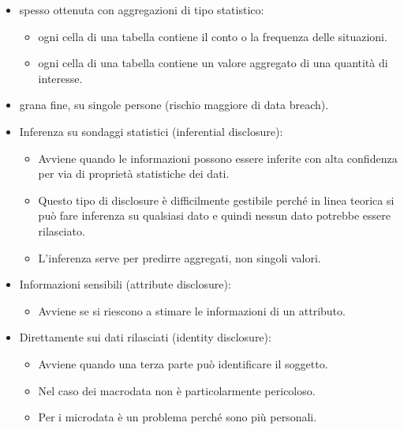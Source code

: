 \begin{itemize}
  \item {} spesso ottenuta con aggregazioni di tipo statistico:
    \begin{itemize}
      \item {} ogni cella di una tabella contiene il conto o la frequenza delle situazioni.
      \item {} ogni cella di una tabella contiene un valore aggregato di una quantità di interesse.
    \end{itemize}
  \item {} grana fine, su singole persone (rischio maggiore di data breach).
\end{itemize}


\begin{itemize}
  \item Inferenza su sondaggi statistici (inferential disclosure):
    \begin{itemize}
      \item Avviene quando le informazioni possono essere inferite con alta confidenza per via di proprietà statistiche dei dati. 
      \item Questo tipo di disclosure è difficilmente gestibile perché in linea teorica si può fare inferenza su qualsiasi dato e quindi nessun dato potrebbe essere rilasciato. 
      \item L'inferenza serve per predirre aggregati, non singoli valori.
    \end{itemize}
  \item Informazioni sensibili (attribute disclosure):
    \begin{itemize}
      \item Avviene se si riescono a stimare le informazioni di un attributo.
    \end{itemize}
  \item Direttamente sui dati rilasciati (identity disclosure):
    \begin{itemize}
      \item Avviene quando una terza parte può identificare il soggetto. 
      \item Nel caso dei macrodata non è particolarmente pericoloso. 
      \item Per i microdata è un problema perché sono più personali.
    \end{itemize}
\end{itemize}

